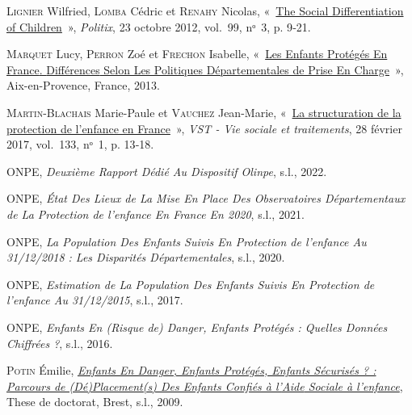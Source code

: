 \documentclass[
  12,
  a4paper,
]{report}
\newlength{\cslhangindent}
\newlength{\cslentryspacingunit} %
\newenvironment{CSLReferences}[2] %
 {%
  \setlength{\parindent}{0pt}
  \ifodd #1
  \let\oldpar\par
  \def\par{\hangindent=\cslhangindent\oldpar}
  \fi
  \setlength{\parskip}{#2\cslentryspacingunit}
 }%
 {}
\begin{document}
\begin{CSLReferences}{0}{0}
\leavevmode{}%
\textsc{Lignier} Wilfried, \textsc{Lomba} Cédric et \textsc{Renahy}
Nicolas,
{«~\href{http://www.cairn.info/revue-politix-2012-3-page-9.htm}{The
Social Differentiation of Children}~»}, \emph{Politix}, 23 octobre 2012,
vol.~99, nᵒ~3, p. 9‑21.

\leavevmode{}%
\textsc{Marquet} Lucy, \textsc{Perron} Zoé et \textsc{Frechon} Isabelle,
{«~\href{https://hal.archives-ouvertes.fr/hal-02383909}{Les Enfants
Protégés En {France}. {Différences} Selon Les Politiques Départementales
de Prise En Charge}~»}, {Aix-en-Provence, France}, 2013.

\leavevmode{}%
\textsc{Martin-Blachais} Marie-Paule et \textsc{Vauchez} Jean-Marie,
{«~\href{http://www.cairn.info/revue-vie-sociale-et-traitements-2017-1-page-13.htm}{La
structuration de la protection de l'enfance en France}~»}, \emph{VST -
Vie sociale et traitements}, 28 février 2017, vol.~133, nᵒ~1, p. 13‑18.

\leavevmode{}%
\textsc{ONPE}, \emph{Deuxième Rapport Dédié Au Dispositif {Olinpe}},
s.l., 2022.

\leavevmode{}%
\textsc{ONPE}, \emph{État Des Lieux de La Mise En Place Des
Observatoires Départementaux de La Protection de l'enfance En {France}
En 2020}, s.l., 2021.

\leavevmode{}%
\textsc{ONPE}, \emph{La Population Des Enfants Suivis En Protection de
l'enfance Au 31/12/2018 : Les Disparités Départementales}, s.l., 2020.

\leavevmode{}%
\textsc{ONPE}, \emph{Estimation de La Population Des Enfants Suivis En
Protection de l'enfance Au 31/12/2015}, s.l., 2017.

\leavevmode{}%
\textsc{ONPE}, \emph{Enfants En (Risque de) Danger, Enfants Protégés :
Quelles Données Chiffrées ?}, s.l., 2016.

\leavevmode{}%
\textsc{Potin} Émilie,
\emph{\href{http://www.theses.fr/2009BRES1008}{Enfants En Danger,
Enfants Protégés, Enfants Sécurisés ? : Parcours de (Dé)Placement(s) Des
Enfants Confiés à l'{Aide} Sociale à l'enfance}}, These de doctorat,
{Brest}, s.l., 2009.


\end{CSLReferences}
\end{document}
